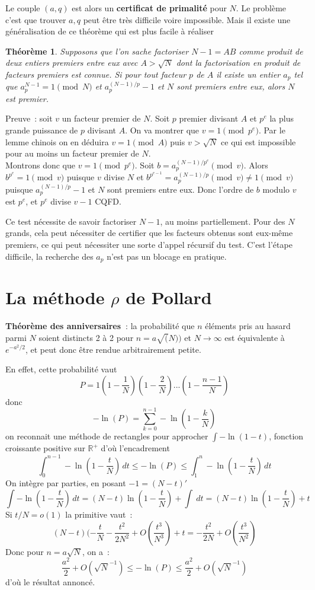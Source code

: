 \documentclass[a4paper,11pt]{book}
\newtheorem{thm}{Théorème}
\begin{document}
\begin{giacjshere}
Le couple $(a,q)$ est alors un 
{\bf certificat de primalit\'e} pour $N$.
Le probl\`eme c'est que trouver $a,q$ peut \^etre tr\`es difficile
voire impossible. Mais il existe une g\'en\'eralisation de ce
th\'eor\`eme qui est plus facile \`a r\'ealiser
\begin{thm}
Supposons que l'on sache factoriser $N-1=AB$ comme produit de deux entiers
premiers entre eux avec $A>\sqrt{N}$ dont la factorisation en produit
de facteurs premiers est connue. Si pour tout facteur $p$ de $A$ il
existe un entier $a_p$ tel que $a_p^{N-1}=1 \pmod N$ et
$a_p^{(N-1)/p}-1$ et $N$ sont premiers entre eux, alors $N$ est premier.
\end{thm}
Preuve~: soit $v$ un facteur premier de $N$. 
Soit $p$ premier divisant $A$ et $p^e$ la plus grande
puissance de $p$ divisant $A$. On va montrer que $v=1 \pmod{p^e}$.
Par le lemme chinois on en d\'eduira $v=1 \pmod A$ puis $v>\sqrt{N}$
ce qui est impossible pour au moins un facteur premier de $N$.\\
Montrons donc que $v=1 \pmod{p^e}$. Soit $b=a_p^{(N-1)/p^e} \pmod v$. Alors $b^{p^e}=1 \pmod v$
puisque $v$ divise $N$ et $b^{p^{e-1}} = a_p^{(N-1)/p} \pmod v \neq 1
\pmod v$ puisque $a_p^{(N-1)/p}-1$ et $N$ sont premiers entre eux.
Donc l'ordre de $b$ modulo $v$ est $p^e$, et $p^e$ divise $v-1$ CQFD.

Ce test n\'ecessite de savoir factoriser $N-1$, au moins
partiellement. Pour des $N$ grands, cela peut n\'ecessiter
de certifier que les facteurs obtenus sont eux-m\^eme premiers,
ce qui peut n\'ecessiter une sorte d'appel r\'ecursif du test. C'est
l'\'etape difficile, la recherche des $a_p$ n'est pas un blocage en pratique.

\section{La m\'ethode $\rho$ de Pollard} 
{\bf Théorème des anniversaires~}: la probabilit\'e que $n$ éléments pris au
hasard parmi $N$ soient distincts 2 à 2 pour 
$n=a \sqrt(N))$ et $N\rightarrow \infty$ 
est \'equivalente \`a $e^{-a^2/2}$, 
et peut donc être rendue arbitrairement petite.

En effet, cette probabilit\'e vaut
$$ P=1(1-\frac1N)(1-\frac2N)...(1-\frac{n-1}{N})$$
donc
$$ -\ln(P)=\sum_{k=0}^{n-1} -\ln(1-\frac{k}{N})  $$
on reconnait une m\'ethode de rectangles pour approcher $\int
-\ln(1-t)$, fonction croissante positive sur $\mathbb{R}^+$ d'o\`u l'encadrement
$$ \int_{0}^{n-1} -\ln(1-\frac{t}{N}) \, dt \leq -\ln(P) \leq
\int_{1}^{n} -\ln(1-\frac{t}{N})  \, dt $$
On int\`egre par parties, en posant $-1=(N-t)'$ 
$$ \int -\ln(1-\frac{t}{N}) \, dt 
= (N-t) \ln(1-\frac{t}{N}) + \int \ dt 
= (N-t) \ln(1-\frac{t}{N}) + t $$
Si $t/N=o(1)$ la primitive vaut~:
$$ (N-t)(-\frac{t}{N}-\frac{t^2}{2N^2}+O(\frac{t^3}{N^3})+t
=-\frac{t^2}{2N} + O(\frac{t^3}{N^2}) $$
Donc pour $n=a\sqrt{N}$, on a~:
$$ \frac{a^2}{2}+ O(\sqrt{N}^{-1})
\leq -\ln(P) 
\leq \frac{a^2}{2}+ O(\sqrt{N}^{-1})$$
d'o\`u le r\'esultat annonc\'e.


\end{giacjshere}
\end{document}

